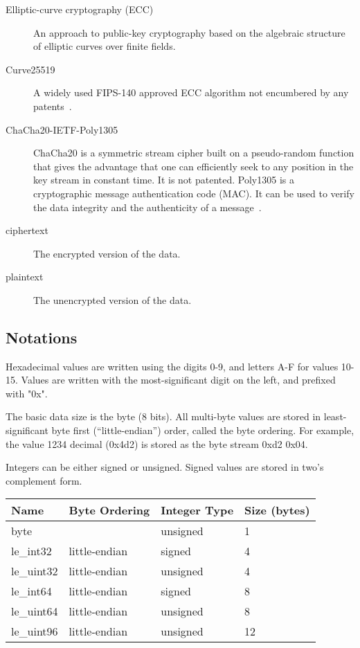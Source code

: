 \begin{description}
\item[Elliptic-curve cryptography (ECC)] %
  An approach to public-key cryptography based on the algebraic structure of elliptic curves over finite fields.
\item[Curve25519] %
  A widely used FIPS-140 approved ECC algorithm not encumbered by any patents~\cite{RFC7748}.
\item[ChaCha20-IETF-Poly1305] %
  ChaCha20 is a symmetric stream cipher built on a pseudo-random function that gives the advantage that one can efficiently seek to any position in the key stream in constant time.
  It is not patented.
  Poly1305 is a cryptographic message authentication code (MAC).
  It can be used to verify the data integrity and the authenticity of a message~\cite{RFC8439}.
\item[ciphertext] %
  The encrypted version of the data.
\item[plaintext] %
  The unencrypted version of the data.
\end{description}

\subsection{Notations}

Hexadecimal values are written using the digits 0-9, and letters A-F for values 10-15.
%
Values are written with the most-significant digit on the left, and prefixed with "0x".

The basic data size is the byte (8 bits).
%
All multi-byte values are stored in least-significant byte first (``little-endian'') order, called the byte ordering.
%
For example, the value 1234 decimal (0x4d2) is stored as the byte stream 0xd2 0x04.

Integers can be either signed or unsigned.
%
Signed values are stored in two's complement form.

\begin{center}
\begin{tabular}{l l l l}
\hline
\textbf{Name} & \textbf{Byte Ordering} & \textbf{Integer Type} & \textbf{Size (bytes)} \\
\hline
byte & & unsigned & 1 \\
le\_int32 & little-endian & signed & 4 \\
le\_uint32 & little-endian & unsigned & 4 \\
le\_int64 & little-endian & signed & 8 \\
le\_uint64 & little-endian & unsigned & 8 \\
le\_uint96 & little-endian & unsigned & 12 \\
\end{tabular}
\end{center}

